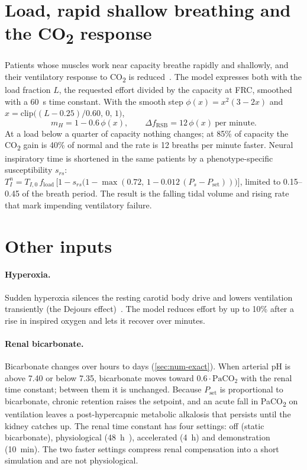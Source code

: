 \section{Load, rapid shallow breathing and the CO\textsubscript{2} response}
\label{sec:ctl-load}
Patients whose muscles work near capacity breathe rapidly and shallowly, and their ventilatory response to CO\textsubscript{2} is reduced~\citep{tobin1983,yang1991}. The model expresses both with the load fraction $L$, the requested effort divided by the capacity at FRC, smoothed with a \SI{60}{\second} time constant. With the smooth step $\phi(x) = x^2(3-2x)$ and $x = \mathrm{clip}\bigl((L - 0.25)/0.60,\,0,\,1\bigr)$,
\begin{equation}
m_H = 1 - 0.6\,\phi(x),\qquad \Delta f_{\mathrm{RSB}} = 12\,\phi(x)\ \text{per minute}.
\label{eq:ctl-load}
\end{equation}
At a load below a quarter of capacity nothing changes; at 85\% of capacity the CO\textsubscript{2} gain is 40\% of normal and the rate is 12 breaths per minute faster. Neural inspiratory time is shortened in the same patients by a phenotype-specific susceptibility $s_{rs}$: $T_I^{n} = T_{I,0}\,f_{\mathrm{load}}\,\bigl[1 - s_{rs}\bigl(1 - \max(0.72,\,1 - 0.012\,(P_s - P_{\mathrm{set}}))\bigr)\bigr]$, limited to 0.15--0.45 of the breath period. The result is the falling tidal volume and rising rate that mark impending ventilatory failure.

\section{Other inputs}
\label{sec:ctl-other}
\paragraph{Hyperoxia.} Sudden hyperoxia silences the resting carotid body drive and lowers ventilation transiently (the Dejours effect)~\citep{dejours1962}. The model reduces effort by up to 10\% after a rise in inspired oxygen and lets it recover over minutes.

\paragraph{Renal bicarbonate.} Bicarbonate changes over hours to days (\cref{sec:num-exact}). When arterial pH is above 7.40 or below 7.35, bicarbonate moves toward $0.6\cdot\mathrm{PaCO_2}$ with the renal time constant; between them it is unchanged. Because $P_{\mathrm{set}}$ is proportional to bicarbonate, chronic retention raises the setpoint, and an acute fall in PaCO\textsubscript{2} on ventilation leaves a post-hypercapnic metabolic alkalosis that persists until the kidney catches up. The renal time constant has four settings: off (static bicarbonate), physiological (\SI{48}{\hour}~\citep{brackett1969}), accelerated (\SI{4}{\hour}) and demonstration (\SI{10}{\minute}). The two faster settings compress renal compensation into a short simulation and are not physiological.

